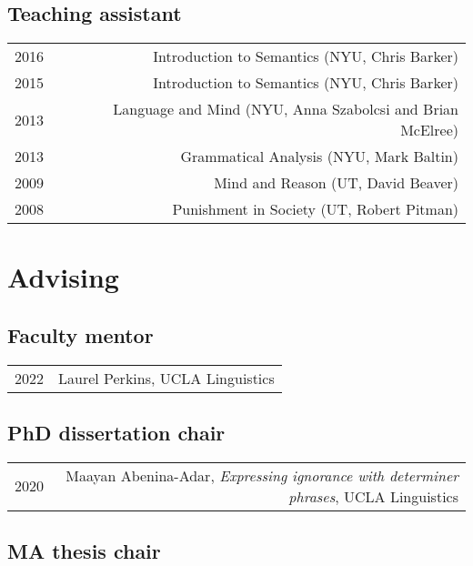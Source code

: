 \documentclass[12pt]{article}
\begin{document}
\subsection*{Teaching assistant}

\begin{longtable}{LR}
  2016 & Introduction to Semantics (NYU, Chris Barker)
         \\
  2015 & Introduction to Semantics (NYU, Chris Barker)
         \\
  2013 & Language and Mind (NYU, Anna Szabolcsi and Brian McElree)
         \\
  2013 & Grammatical Analysis (NYU, Mark Baltin)
         \\
  2009 & Mind and Reason (UT, David Beaver)
         \\
  2008 & Punishment in Society (UT, Robert Pitman)
\end{longtable}


\medskip

\section*{Advising}

\subsection*{Faculty mentor}

\begin{longtable}{LR}
  2022    & Laurel Perkins, UCLA Linguistics
\end{longtable}

\subsection*{PhD dissertation chair}

\begin{longtable}{LR}
  2020    & Maayan Abenina-Adar, \textit{Expressing ignorance with determiner
            phrases}, UCLA Linguistics
\end{longtable}

\subsection*{MA thesis chair}
\end{document}
